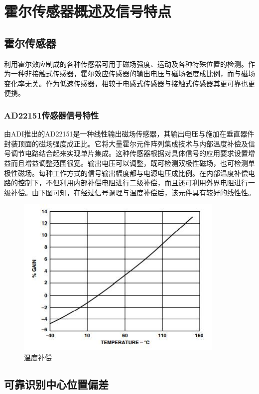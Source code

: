 \section{霍尔传感器概述及信号特点}

\subsection{霍尔传感器}
\par{利用霍尔效应制成的各种传感器可用于磁场强度、运动及各种特殊位置的检测。作为一种非接触式传感器，霍尔效应传感器的输出电压与磁场强度成比例，而与磁场变化率无关。作为低速传感器，相较于电感式传感器与接触式传感器其更可靠也更便携。}

\subsubsection{AD22151传感器信号特性}
\par{由ADI推出的AD22151是一种线性输出磁场传感器，其输出电压与施加在垂直器件封装顶面的磁场强度成正比。它将大量霍尔元件阵列集成技术与内部温度补偿及信号调节电路结合起来实现单片集成。这种传感器根据对具体信号的应用要求设置增益而且增益调整范围很宽。输出电压可以调整，既可检测双极性磁场，也可检测单极性磁场。每种工作方式的信号输出幅度都与电源电压成比例。在内部温度补偿电路的控制下，不但利用内部补偿电阻进行二级补偿，而且还可利用外界电阻进行一级补偿。由下图可知，在经过信号调理与温度补偿后，该元件具有较好的线性性。}

\begin{figure}[H]
\centering
\includegraphics[width=10cm]{figure/2.1.jpg}
\caption{温度补偿} \label{fig:2.1}
\end{figure}

\subsection{可靠识别中心位置偏差}

